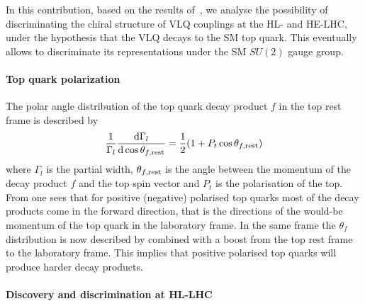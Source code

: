 In this contribution, based on the results of~\cite{Barducci:2017xtw}, we analyse the possibility of discriminating the chiral structure of VLQ couplings at the HL- and HE-LHC, under the hypothesis that the VLQ decays to the SM top quark. This eventually allows to discriminate its representations under the SM $SU(2)$ gauge group. 

\paragraph*{Top quark polarization}

The polar angle distribution of the top quark decay product $f$ in the top rest frame is described by
\begin{equation}
\frac{1}{\Gamma_l} \frac{{\rm d} \Gamma_l}{{\rm d}\cos \theta_{f,{\rm rest}}}=\frac{1}{2}(1+ P_t \cos\theta_{f,{\rm rest}})
\label{eq:pol-angle}
\end{equation}
where $\Gamma_l$ is the partial width, $\theta_{f,{\rm rest}}$ is the angle between the momentum of the decay product $f$ and the top spin vector and $P_t$ is the polarisation of the top. From  one sees that for positive (negative) polarised top quarks most of the decay products come in the forward direction, that is the directions of the would-be momentum of the top quark in the laboratory frame. 
In the same frame the $\theta_{f}$ distribution is now described by  combined with a boost from the top rest frame to the laboratory frame. This implies that positive polarised top quarks will produce harder decay products. 

\paragraph*{Discovery and discrimination at HL-LHC}

